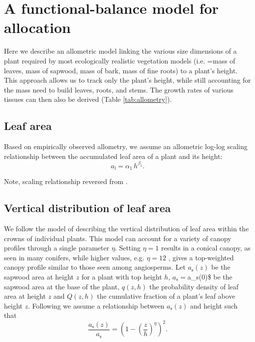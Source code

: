 \documentclass[10pt,twoside]{article}
\begin{document}
\section{A functional-balance model for
allocation}\label{a-functional-balance-model-for-allocation}

Here we describe an allometric model linking the various size dimensions
of a plant required by most ecologically realistic vegetation models
(i.e. =mass of leaves, mass of sapwood, mass of bark, mass of fine
roots) to a plant's height. This approach allows us to track only the
plant's height, while still accounting for the mass need to build
leaves, roots, and stems. The growth rates of various tissues can then
also be derived (Table \ref{tab:allometry}).

\subsection{Leaf area}\label{leaf-area}

Based on empirically observed allometry, we assume an allometric log-log
scaling relationship between the accumulated leaf area of a plant and
its height:
\begin{equation}\label{eq:ha}
a_\textrm{l}=\alpha_1 \, h^{\beta_1}.
\end{equation}

Note, scaling relationship reversed from \citep{Falster-2011}.

\subsection{Vertical distribution of leaf
area}\label{vertical-distribution-of-leaf-area}

We follow the model of \citet{Yokozawa-1995} describing the vertical
distribution of leaf area within the crowns of individual plants. This
model can account for a variety of canopy profiles through a single
parameter \(\eta\). Setting \(\eta=1\) results in a conical canopy, as
seen in many conifers, while higher values, e.g. \(\eta=12\) , gives a
top-weighted canopy profile similar to those seen among angiosperms. Let
\(a_\textrm{s}(z)\) be the sapwood area at height \(z\) for a plant with
top height \(h\), \(a_\textrm{s} =\)a\_\textrm{s}(0)\$ be the sapwood
area at the base of the plant, \(q(z,h)\) the probability density of
leaf area at height \(z\) and \(Q(z,h)\) the cumulative fraction of a
plant's leaf above height \(z\). Following \citet{Yokozawa-1995} we
assume a relationship between \(a_\textrm{s}(z)\) and height such that
\begin{equation}\label{eq:crown1}
\frac{a_\textrm{s}(z)}{a_\textrm{s}}= \left(1-\left(\frac{z}{h}\right)^\eta\right)^2.
\end{equation}
\end{document}
